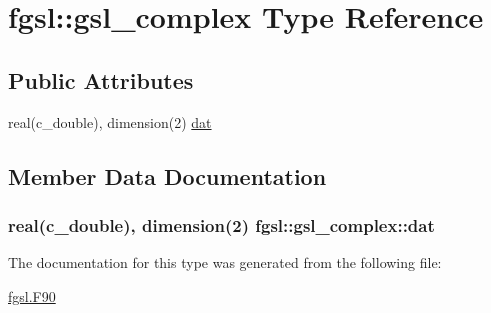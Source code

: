 \hypertarget{structfgsl_1_1gsl__complex}{}\section{fgsl\+:\+:gsl\+\_\+complex Type Reference}
\label{structfgsl_1_1gsl__complex}
\subsection*{Public Attributes}
\begin{DoxyCompactItemize}
\item 
real(c\+\_\+double), dimension(2) \hyperlink{structfgsl_1_1gsl__complex_a50388c80381b51ae88a07ed9726edf27}{dat}
\end{DoxyCompactItemize}


\subsection{Member Data Documentation}
\hypertarget{structfgsl_1_1gsl__complex_a50388c80381b51ae88a07ed9726edf27}{}
\subsubsection[{dat}]{\setlength{\rightskip}{0pt plus 5cm}real(c\+\_\+double), dimension(2) fgsl\+::gsl\+\_\+complex\+::dat}\label{structfgsl_1_1gsl__complex_a50388c80381b51ae88a07ed9726edf27}


The documentation for this type was generated from the following file\+:\begin{DoxyCompactItemize}
\item 
\hyperlink{fgsl_8F90}{fgsl.\+F90}\end{DoxyCompactItemize}
